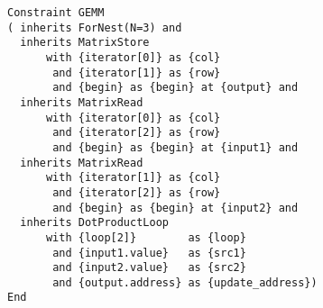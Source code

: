 
\begin{figure}[t]
\begin{lstlisting}[language=IDL,
                   label={fig:gemm},caption={IDL specification of GEMM}]
Constraint GEMM
( inherits ForNest(N=3) and
  inherits MatrixStore
      with {iterator[0]} as {col}
       and {iterator[1]} as {row}
       and {begin} as {begin} at {output} and
  inherits MatrixRead
      with {iterator[0]} as {col}
       and {iterator[2]} as {row}
       and {begin} as {begin} at {input1} and
  inherits MatrixRead
      with {iterator[1]} as {col}
       and {iterator[2]} as {row}
       and {begin} as {begin} at {input2} and
  inherits DotProductLoop
      with {loop[2]}        as {loop}
       and {input1.value}   as {src1}
       and {input2.value}   as {src2}
       and {output.address} as {update_address})
End
\end{lstlisting}
\end{figure}

